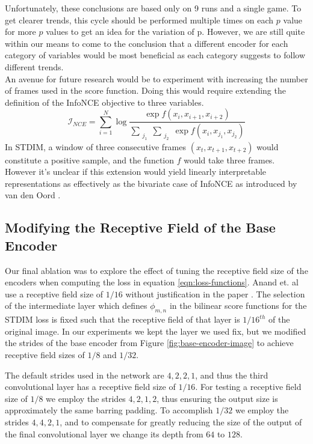 \documentclass{article}
\begin{document}
Unfortunately, these conclusions are based only on 9 runs and a single game. To get clearer trends, this cycle should be performed multiple times on each $p$ value for more $p$ values to get an idea for the variation of p. However, we are still quite within our means to come to the conclusion that a different encoder for each category of variables would be most beneficial as each category suggests to follow different trends. \\

An avenue for future research would be to experiment with increasing the number of frames used in the score function. Doing this would require extending the definition of the InfoNCE objective to three variables.
\begin{equation}
\mathcal{I}_{NCE}=\sum_{i=1}^N\log{\frac{\exp{f(x_i,x_{i+1},x_{i+2})}}{\sum\limits_{\substack{j_1}}\sum\limits_{\substack{j_2}} \exp{f(x_i,x_{j_{1}},x_{j_{2}})}}}
\end{equation}
In STDIM, a window of three consecutive frames $(x_t, x_{t+1},x_{t+2})$ would constitute a positive sample, and  the function $f$ would take three frames. However it's unclear if this extension would yield linearly interpretable representations as effectively as the bivariate case of InfoNCE as introduced by van den Oord \cite{infoNCE}.

\subsection{Modifying the Receptive Field of the Base Encoder}
\label{section:receptive-field}

Our final ablation was to explore the effect of tuning the receptive field size of the encoders when computing the loss in equation \ref{eqn:loss-functions}. Anand et. al use a receptive field size of $1/16$ without justification in the paper \cite{main_article}. The selection of the intermediate layer which defines $\phi_{m,n}$ in the bilinear score functions for the STDIM loss is fixed such that the receptive field of that layer is $1/16^{th}$ of the original image. In our experiments we kept the layer we used fix, but we modified the strides of the base encoder from Figure \ref{fig:base-encoder-image} to achieve receptive field sizes of $1/8$ and $1/32$.

The default strides used in the network are $4, 2, 2, 1$, and thus the third convolutional layer has a receptive field size of $1/16$. For testing a receptive field size of $1/8$ we employ the strides $4, 2, 1, 2$, thus ensuring the output size is approximately the same barring padding. To accomplish $1/32$ we employ the strides $4, 4, 2, 1$, and to compensate for greatly reducing the size of the output of the final convolutional layer we change its depth from $64$ to $128$.
\end{document}
